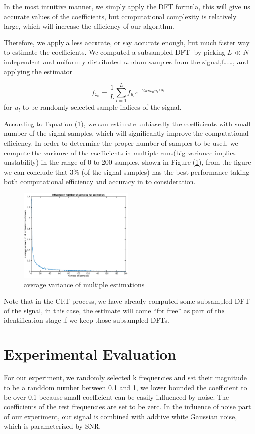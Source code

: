 \documentclass[journal,transmag]{IEEEtran}
\begin{document}
In the most intuitive manner, we simply apply the DFT formula, this will give us  accurate values of the coefficients, but computational complexity is relatively large, which will increase the efficiency of our algorithm.

Therefore, we apply a less accurate, or say accurate enough, but much faster way to estimate the coefficients. We computed a subsampled DFT, by picking $L\ll N$ independent and uniformly distributed random samples from the signal,f……, and applying the estimator

\begin{equation}
	f_{\omega_0}=\frac{1}{L}\sum_{l=1}^{L}f_{u_l}e^{-2\pi i\omega_0u_l/N}
	\label{est}
\end{equation}
for $u_l$ to be randomly selected sample indices of the signal.

According to Equation (\ref{est}), we can estimate unbiasedly the coefficients with small number of the signal samples, which will significantly improve the computational efficiency. In order to determine the proper number of samples to be used, we compute the variance of the coefficients in multiple runs(big variance implies unstability) in the range of 0 to 200 samples, shown in Figure (\ref{est}), from the figure we can conclude that $3\%$ (of the signal samples) has the best performance taking both computational  efficiency and accuracy in to consideration. 

\begin{figure}[htbp]
	\includegraphics[width=0.5\textwidth]{num_est}
	\caption{average variance of multiple estimations}
	\label{est}
\end{figure}

Note that in the CRT process, we have already computed some subsampled DFT of the signal, in this case, the estimate will come “for free” as part of the identification stage if we keep those subsampled DFTs.

\section{Experimental Evaluation}
For our experiment, we randomly selected k frequencies and set their magnitude to be a randdom number between 0.1 and 1, we lower bounded the coefficient to be over 0.1 because small coefficient can be easily influenced by noise. The coefficients of the rest frequencies are set to be zero. In the influence of noise part of our experiment, our signal is combined with addtive white Gaussian noise, which is parameterized by SNR.
\end{document}
